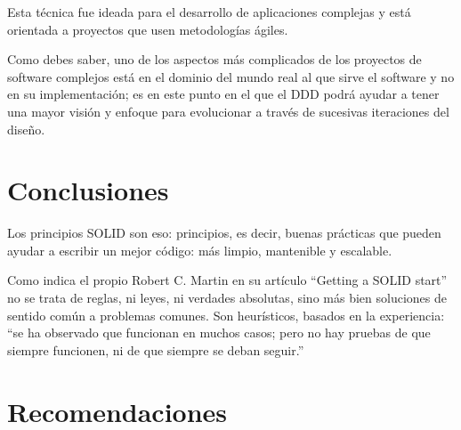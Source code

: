 \documentclass[12pt,letterpaper]{article}
\begin{document}
Esta técnica fue ideada para el desarrollo de aplicaciones complejas y está orientada a proyectos que usen metodologías ágiles.

Como debes saber, uno de los aspectos más complicados de los proyectos de software complejos está en el dominio del mundo real al que sirve el software y no en su implementación; es en este punto en el que el DDD podrá ayudar a tener una mayor visión y enfoque para evolucionar a través de sucesivas iteraciones del diseño.

\section{Conclusiones}
Los principios SOLID son eso: principios, es decir, 
buenas prácticas que pueden ayudar a escribir un mejor código: más limpio, 
mantenible y escalable.

Como indica el propio Robert C. Martin en su artículo “Getting a 
SOLID start” no se trata de reglas, ni leyes, ni verdades absolutas,
 sino más bien soluciones de sentido común a problemas comunes. Son heurísticos,
  basados en la experiencia: “se ha observado que funcionan en muchos casos; 
  pero no hay pruebas de que siempre funcionen, ni de que siempre se deban seguir.”

\section{Recomendaciones}
\end{document}

